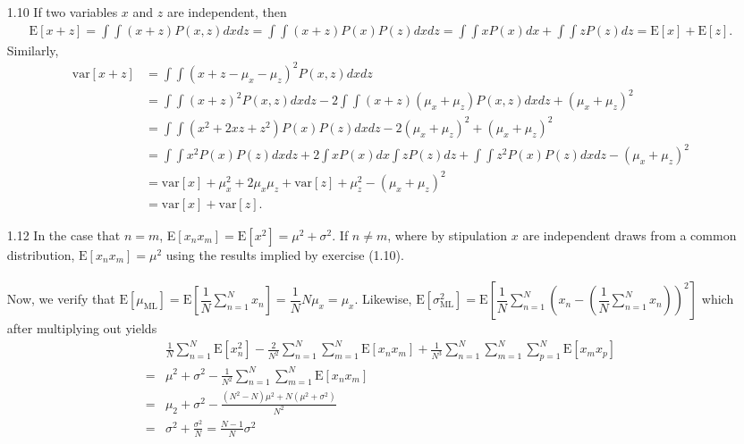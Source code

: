 \documentclass[]{article}
\begin{document}
\begin{enumerate}
 	\item[1.10] If two variables $x$ and $z$ are independent, then
 	\begin{align*}
 	\text{E}[x + z] = \int \int (x + z)P(x,z) dxdz = \int \int (x + z)P(x)P(z) dxdz = \int \int xP(x)dx + \int \int zP(z)dz = \text{E}[x] + \text{E}[z].
 	\end{align*}
 	Similarly,
 	\begin{align*}
 	\text{var}[x + z] &= \int \int (x + z - \mu_x - \mu_z)^2P(x,z) dxdz \\
 	& = \int \int (x + z)^2 P(x,z) dx dz - 2 \int \int (x + z)(\mu_x + \mu_z) P(x,z) dx dz + (\mu_x + \mu_z)^2 \\
 	& = \int \int (x^2 +2xz + z^2) P(x)P(z) dx dz -2(\mu_x + \mu_z)^2 + (\mu_x + \mu_z)^2 \\
 	& = \int \int x^2 P(x)P(z)dxdz + 2\int xP(x)dx\int z P(z)dz + \int \int z^2 P(x)P(z)dx dz - (\mu_x + \mu_z)^2 \\
 	& = \text{var}[x] + \mu_x^2 + 2\mu_x\mu_z + \text{var}[z] + \mu_z^2 - (\mu_x + \mu_z)^2 \\
 	& = \text{var}[x] + \text{var}[z].
 	\end{align*}
 	
 	\item[1.12] In the case that $n=m$, E$[x_nx_m]=\text{E}[x^2]=\mu^2 + \sigma^2$. If $n \neq m$, where by stipulation $x$ are independent draws from a common distribution, $\text{E}[x_n x_m] = \mu^2$ using the results implied by exercise (1.10). \\ \\
 	Now, we verify that $\text{E}\left[\mu_\text{ML}\right] = \text{E} \left[\dfrac{1}{N}\sum_{n=1}^{N}x_n\right] = \dfrac{1}{N}N\mu_x=\mu_x$. Likewise, $\text{E}\left[\sigma^2_\text{ML}\right] = \text{E} \left[ \dfrac{1}{N}\sum_{n=1}^{N}\left(
 	x_n- \left( 
 	\dfrac{1}{N}\sum_{n=1}^{N}x_n 
 	\right) 
 	\right)^2
 	\right]$ which after multiplying out yields
 	\begin{align*}
 	& \frac{1}{N}\sum_{n=1}^{N} \text{E}[x_n^2] - \frac{2}{N^2} \sum_{n=1}^{N} \sum_{m=1}^{N} \text{E}[x_nx_m] + \frac{1}{N^3} \sum_{n=1}^{N} \sum_{m=1}^{N} \sum_{p=1}^{N} \text{E}[x_mx_p] \\
 	=& \mu^2 + \sigma^2 - \frac{1}{N^2} \sum_{n=1}^{N} \sum_{m=1}^{N} \text{E}[x_nx_m] \\
 	= & \mu_2 + \sigma^2 - \frac{(N^2 - N)\mu^2 + N(\mu^2 + \sigma^2)}{N^2} \\
 	=& \sigma^2 + \frac{\sigma^2}{N} = \frac{N-1}{N}\sigma^2
 	\end{align*}
 	

\end{enumerate}
\end{document}
